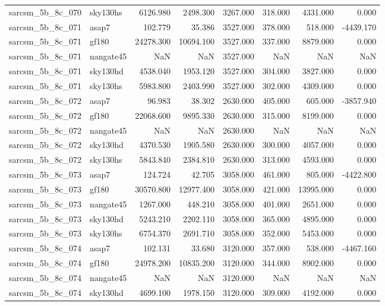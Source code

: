 \begin{tabular}{llrrrrrr}
sarcsm\_5b\_8c\_070 & sky130hs & 6126.980 & 2498.300 & 3267.000 & 318.000 & 4331.000 & 0.000 \\
sarcsm\_5b\_8c\_071 & asap7 & 102.779 & 35.386 & 3527.000 & 378.000 & 518.000 & -4439.170 \\
sarcsm\_5b\_8c\_071 & gf180 & 24278.300 & 10694.100 & 3527.000 & 337.000 & 8879.000 & 0.000 \\
sarcsm\_5b\_8c\_071 & nangate45 & NaN & NaN & 3527.000 & NaN & NaN & NaN \\
sarcsm\_5b\_8c\_071 & sky130hd & 4538.040 & 1953.120 & 3527.000 & 304.000 & 3827.000 & 0.000 \\
sarcsm\_5b\_8c\_071 & sky130hs & 5983.800 & 2403.990 & 3527.000 & 302.000 & 4309.000 & 0.000 \\
sarcsm\_5b\_8c\_072 & asap7 & 96.983 & 38.302 & 2630.000 & 405.000 & 605.000 & -3857.940 \\
sarcsm\_5b\_8c\_072 & gf180 & 22068.600 & 9895.330 & 2630.000 & 315.000 & 8199.000 & 0.000 \\
sarcsm\_5b\_8c\_072 & nangate45 & NaN & NaN & 2630.000 & NaN & NaN & NaN \\
sarcsm\_5b\_8c\_072 & sky130hd & 4370.530 & 1905.580 & 2630.000 & 300.000 & 4057.000 & 0.000 \\
sarcsm\_5b\_8c\_072 & sky130hs & 5843.840 & 2384.810 & 2630.000 & 313.000 & 4593.000 & 0.000 \\
sarcsm\_5b\_8c\_073 & asap7 & 124.724 & 42.705 & 3058.000 & 461.000 & 805.000 & -4422.800 \\
sarcsm\_5b\_8c\_073 & gf180 & 30570.800 & 12977.400 & 3058.000 & 421.000 & 13995.000 & 0.000 \\
sarcsm\_5b\_8c\_073 & nangate45 & 1267.000 & 448.210 & 3058.000 & 401.000 & 2651.000 & 0.000 \\
sarcsm\_5b\_8c\_073 & sky130hd & 5243.210 & 2202.110 & 3058.000 & 365.000 & 4895.000 & 0.000 \\
sarcsm\_5b\_8c\_073 & sky130hs & 6754.370 & 2691.710 & 3058.000 & 352.000 & 5453.000 & 0.000 \\
sarcsm\_5b\_8c\_074 & asap7 & 102.131 & 33.680 & 3120.000 & 357.000 & 538.000 & -4467.160 \\
sarcsm\_5b\_8c\_074 & gf180 & 24978.200 & 10835.200 & 3120.000 & 344.000 & 8902.000 & 0.000 \\
sarcsm\_5b\_8c\_074 & nangate45 & NaN & NaN & 3120.000 & NaN & NaN & NaN \\
sarcsm\_5b\_8c\_074 & sky130hd & 4699.100 & 1978.150 & 3120.000 & 309.000 & 4192.000 & 0.000 \\

\end{tabular}
